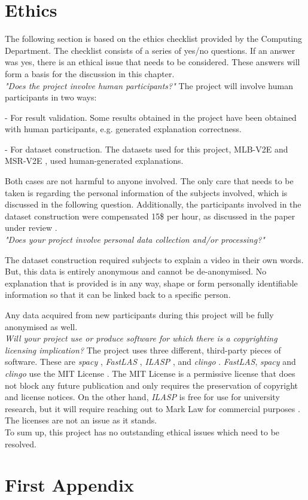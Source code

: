 \appendix
\chapter{Ethics}

The following section is based on the ethics checklist provided by the Computing Department. 
The checklist consists of a series of yes/no questions. 
If an answer was yes, there is an ethical issue that needs to be considered.
These answers will form a basis for the discussion in this chapter. \\


\emph{"Does the project involve human participants?"}
The project will involve human participants in two ways: 

    - For result validation. Some results obtained in the project have been obtained with human participants, e.g. generated explanation correctness.
    
    - For dataset construction. The datasets used for this project, MLB-V2E \cite{RefWorks:RefID:16-2021automatic} and MSR-V2E \cite{RefWorks:RefID:16-2021automatic}, used human-generated explanations.

Both cases are not harmful to anyone involved. The only care that needs to be taken is regarding the personal information of the subjects involved, which is discussed in the following question.
Additionally, the participants involved in the dataset construction were compensated 15\$ per hour, as discussed in the paper under review \cite{RefWorks:RefID:16-2021automatic}.\\

\emph{"Does your project involve personal data collection and/or processing?"}

The dataset construction required subjects to explain a video in their own words.
But, this data is entirely anonymous and cannot be de-anonymised.
No explanation that is provided is in any way, shape or form personally identifiable information so that it can be linked back to a specific person.

Any data acquired from new participants during this project will be fully anonymised as well. \\

\emph{Will your project use or produce software for which there is a copyrighting licensing implication?}
The project uses three different, third-party pieces of software.
These are \emph{spacy} \cite{RefWorks:RefID:24-spacy}, \emph{FastLAS} \cite{RefWorks:RefID:19-law2020fastlas:}, \emph{ILASP} \cite{RefWorks:RefID:18-law2020ilasp}, and \emph{clingo} \cite{RefWorks:RefID:22-clingo}.
\emph{FastLAS}, \emph{spacy} and \emph{clingo} use the MIT License \cite{RefWorks:RefID:53-mit}.
The MIT License is a permissive license that does not block any future publication and only requires the preservation of copyright and license notices.
On the other hand, \emph{ILASP} is free for use for university research, but it will require reaching out to Mark Law for commercial purposes \cite{RefWorks:RefID:54-ilasp}.
The licenses are not an issue as it stands. \\


To sum up, this project has no outstanding ethical issues which need to be resolved.

\chapter{First Appendix}